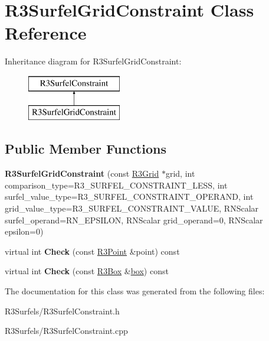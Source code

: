 \hypertarget{class_r3_surfel_grid_constraint}{}\section{R3\+Surfel\+Grid\+Constraint Class Reference}
\label{class_r3_surfel_grid_constraint}
Inheritance diagram for R3\+Surfel\+Grid\+Constraint\+:\begin{figure}[H]
\begin{center}
\leavevmode
\includegraphics[height=2.000000cm]{class_r3_surfel_grid_constraint}
\end{center}
\end{figure}
\subsection*{Public Member Functions}
\begin{DoxyCompactItemize}
\item 
{\bfseries R3\+Surfel\+Grid\+Constraint} (const \hyperlink{class_r3_grid}{R3\+Grid} $\ast$grid, int comparison\+\_\+type=R3\+\_\+\+S\+U\+R\+F\+E\+L\+\_\+\+C\+O\+N\+S\+T\+R\+A\+I\+N\+T\+\_\+\+L\+E\+SS, int surfel\+\_\+value\+\_\+type=R3\+\_\+\+S\+U\+R\+F\+E\+L\+\_\+\+C\+O\+N\+S\+T\+R\+A\+I\+N\+T\+\_\+\+O\+P\+E\+R\+A\+ND, int grid\+\_\+value\+\_\+type=R3\+\_\+\+S\+U\+R\+F\+E\+L\+\_\+\+C\+O\+N\+S\+T\+R\+A\+I\+N\+T\+\_\+\+V\+A\+L\+UE, R\+N\+Scalar surfel\+\_\+operand=R\+N\+\_\+\+E\+P\+S\+I\+L\+ON, R\+N\+Scalar grid\+\_\+operand=0, R\+N\+Scalar epsilon=0)\hypertarget{class_r3_surfel_grid_constraint_a20c8e4506ed3020f6e2ab79a27e3c6e7}{}\label{class_r3_surfel_grid_constraint_a20c8e4506ed3020f6e2ab79a27e3c6e7}

\item 
virtual int {\bfseries Check} (const \hyperlink{class_r3_point}{R3\+Point} \&point) const \hypertarget{class_r3_surfel_grid_constraint_a4d7d00a332ca57b3ed3b0254f9950252}{}\label{class_r3_surfel_grid_constraint_a4d7d00a332ca57b3ed3b0254f9950252}

\item 
virtual int {\bfseries Check} (const \hyperlink{class_r3_box}{R3\+Box} \&\hyperlink{structbox}{box}) const \hypertarget{class_r3_surfel_grid_constraint_a6f42ae9412b08bd1d73265950fc64642}{}\label{class_r3_surfel_grid_constraint_a6f42ae9412b08bd1d73265950fc64642}

\end{DoxyCompactItemize}


The documentation for this class was generated from the following files\+:\begin{DoxyCompactItemize}
\item 
R3\+Surfels/R3\+Surfel\+Constraint.\+h\item 
R3\+Surfels/R3\+Surfel\+Constraint.\+cpp\end{DoxyCompactItemize}
